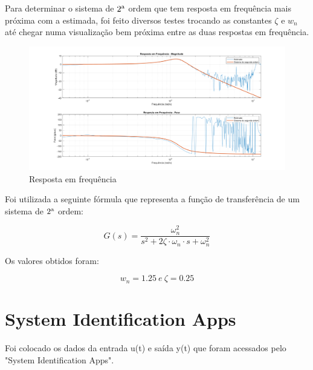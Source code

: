 \documentclass[10pt]{article}
\begin{document}
\quad Para determinar o sistema de $2\textsuperscript{a}$ ordem que tem resposta em frequência mais próxima com a estimada,
foi feito diversos testes trocando as constantes $\zeta$ e $w_n$
até chegar numa visualização bem próxima entre as duas respostas em frequência.

\begin{figure}[h]
    \centering
    \includegraphics[scale=0.35]{g_manual.png}
    \caption{Resposta em frequência}
\end{figure}

\quad Foi utilizada a seguinte fórmula que representa a função de transferência de um sistema de $2\textsuperscript{a}$ ordem:

\begin{equation}
    G(s) = \frac{\omega_n^2}{s^2 + 2 \zeta \cdot \omega_n \cdot s + \omega_n^2}
\end{equation}

\quad Os valores obtidos foram:

\begin{equation}
    w_n = 1.25 \ e \ \zeta = 0.25
\end{equation}

\newpage

\section{System Identification Apps}

\quad Foi colocado os dados da entrada u(t) e saída y(t) que foram acessados pelo "System Identification Apps".
\end{document}
